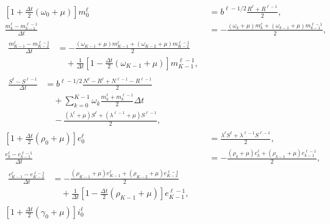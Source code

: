 \documentclass[USenglish]{article}
\begin{document}
\begin{subequations}
  \label{numerics_time_since_entry_structured}
  \begin{align}
    \left[1 + \frac{\Delta t}{2} (\omega_0 + \mu)\right] m_0^{\ell}
    &= b^{\ell - 1 / 2} \frac{R^{\ell} + R^{\ell - 1}}{2},
    \\
    \frac{m_k^{\ell} - m_{k - 1}^{\ell - 1}}{\Delta t} &=
    - \frac{(\omega_k + \mu) m_k^{\ell}
      + (\omega_{k - 1} + \mu) m_{k - 1}^{\ell - 1}}{2},
    \\
    \begin{split}
      \frac{m_{K - 1}^{\ell} - m_{K - 2}^{\ell - 1}}{\Delta t} &=
      - \frac{(\omega_{K - 1} + \mu) m_{K - 1}^{\ell}
        + (\omega_{K - 2} + \mu) m_{K - 2}^{\ell - 1}}{2}
      \\ & \quad {}
      + \frac{1}{\Delta t} \left[
        1 - \frac{\Delta t}{2} (\omega_{K - 1} + \mu)
      \right] m_{K - 1}^{\ell - 1},
    \end{split}
    \\
    \begin{split}
      \frac{S^{\ell} - S^{\ell - 1}}{\Delta t} &=
      b^{\ell - 1 / 2}
      \frac{N^{\ell} - R^{\ell} + N^{\ell - 1} - R^{\ell - 1}}{2}
      \\ & \quad {}
      + \sum_{k = 0}^{K - 1} \omega_k
      \frac{m_k^{\ell} + m_k^{\ell - 1}}{2}
      \Delta t
      \\ & \quad {}
      - \frac{(\lambda^{\ell} + \mu) S^{\ell}
        + (\lambda^{\ell - 1} + \mu) S^{\ell - 1}}{2},
    \end{split}
    \\
    \left[1 + \frac{\Delta t}{2} (\rho_0 + \mu)\right] e_0^{\ell}
    &= \frac{\lambda^{\ell} S^{\ell} + \lambda^{\ell - 1} S^{\ell - 1}}{2},
    \\
    \frac{e_k^{\ell} - e_{k - 1}^{\ell - 1}}{\Delta t} &=
    - \frac{(\rho_k + \mu) e_k^{\ell}
      + (\rho_{k - 1} + \mu) e_{k - 1}^{\ell - 1}}{2},
    \\
    \begin{split}
      \frac{e_{K - 1}^{\ell} - e_{K - 2}^{\ell - 1}}{\Delta t} &=
      - \frac{(\rho_{K - 1} + \mu) e_{K - 1}^{\ell}
        + (\rho_{K - 2} + \mu) e_{K - 2}^{\ell - 1}}{2}
      \\ & \quad {}
      + \frac{1}{\Delta t} \left[
        1 - \frac{\Delta t}{2} (\rho_{K - 1} + \mu)
      \right] e_{K - 1}^{\ell - 1},
    \end{split}
    \\
    \left[1 + \frac{\Delta t}{2} (\gamma_0 + \mu)\right] i_0^{\ell}

\end{align}
\end{subequations}
\end{document}
